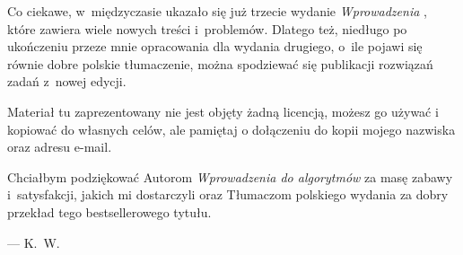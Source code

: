 Co ciekawe, w~międzyczasie ukazało się już trzecie wydanie \textsl{Wprowadzenia} \cite{cormen3}, które zawiera wiele nowych treści i~problemów. Dlatego też, niedługo po ukończeniu przeze mnie opracowania dla wydania drugiego, o~ile pojawi się równie dobre polskie tłumaczenie, można spodziewać się publikacji rozwiązań zadań z~nowej edycji.

Materiał tu zaprezentowany nie jest objęty żadną licencją, możesz go używać i kopiować do własnych celów, ale pamiętaj o dołączeniu do kopii mojego nazwiska oraz adresu e-mail.

Chciałbym podziękować Autorom \textsl{Wprowadzenia do algorytmów} za masę zabawy i~satysfakcji, jakich mi dostarczyli oraz Tłumaczom polskiego wydania za dobry przekład tego bestsellerowego tytułu.

\bigskip
{}\hfill--- K.~W.

\endinput
